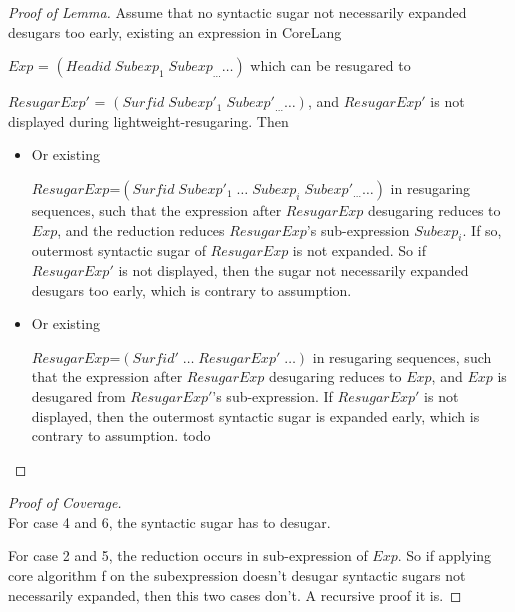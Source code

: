 \begin{proof}[Proof of Lemma]
Assume that no syntactic sugar not necessarily expanded desugars too early, existing an expression in CoreLang

$Exp$ = $(Headid\;Subexp_{1}\;Subexp_{\ldots} \ldots)$ which can be resugared to

$ResugarExp'$ = $(Surfid\;Subexp'_{1}\;Subexp'_{\ldots}\ldots)$, and $ResugarExp'$ is not displayed during lightweight-resugaring. Then

\begin{itemize}
	\item Or existing
	
	$ResugarExp$=$(Surfid\;Subexp'_{1}\;\ldots\;Subexp_{i}\;Subexp'_{\ldots}\ldots)$ in resugaring sequences, such that the expression after $ResugarExp$ desugaring reduces to $Exp$, and the reduction reduces $ResugarExp$'s sub-expression $Subexp_{i}$. If so, outermost syntactic sugar of $ResugarExp$ is not expanded. So if $ResugarExp'$ is not displayed, then the sugar not necessarily expanded desugars too early, which is contrary to assumption.
	
	
	\item Or existing
	
	$ResugarExp$=$(Surfid'\;\ldots\;ResugarExp'\;\ldots)$ in resugaring sequences, such that the expression after $ResugarExp$ desugaring reduces to $Exp$, and $Exp$ is desugared from $ResugarExp'$'s sub-expression. If $ResugarExp'$ is not displayed, then the outermost syntactic sugar is expanded early, which is contrary to assumption.
	todo

\end{itemize}
\end{proof}

\begin{proof}[Proof of Coverage]
\hfill\\
For case 4 and 6, the syntactic sugar has to desugar.

For case 2 and 5, the reduction occurs in sub-expression of $Exp$. So if applying core algorithm f on the subexpression doesn't desugar syntactic sugars not necessarily expanded, then this two cases don't. A recursive proof it is.
\end{proof}